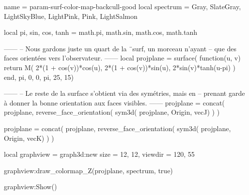 \documentclass{standalone}
\begin{document}
\begin{luadraw}{name = param-surf-color-map-backcull-good}
local spectrum = {Gray, SlateGray, LightSkyBlue, LightPink, Pink, LightSalmon}

local pi, sin, cos, tanh = math.pi, math.sin, math.cos, math.tanh

------
-- Nous gardons juste un quart de la ¨surf, un morceau n'ayant
-- que des faces orientées vers l'observateur.
------
local projplane = surface(
  function(u, v)
    return M(
      2*(1 + cos(v))*cos(u),
      2*(1 + cos(v))*sin(u),
      2*sin(v)*tanh(u-pi)
    )
  end,
  pi, 0, 0, pi,
  {25, 15})

------
-- Le reste de la surface s'obtient via des symétries, mais en
-- prenant garde à donner la bonne orientation aux faces visibles.
------
projplane = concat(
  projplane,
  reverse_face_orientation(
    sym3d(
      projplane,
      {Origin, vecJ})
  )
)

projplane = concat(
  projplane,
  reverse_face_orientation(
    sym3d(
      projplane,
      {Origin, vecK})
  )
)

local graphview = graph3d:new{
  size    = {12, 12},
  viewdir = {120, 55}
}

graphview:draw_colormap_Z(projplane, spectrum, true)

graphview:Show()
\end{luadraw}
\end{document}
